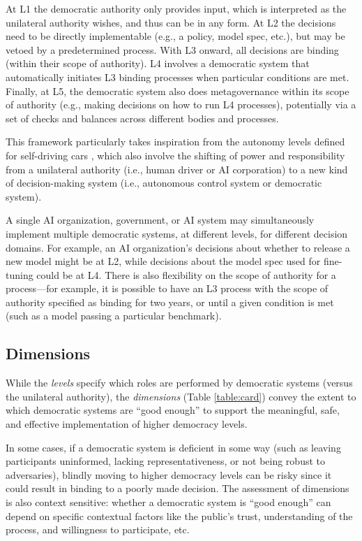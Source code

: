 \documentclass{article}
\begin{document}
    At L1 the democratic authority only provides input, which is interpreted as the unilateral authority wishes, and thus can be in any form. At L2 the decisions need to be directly implementable (e.g., a policy, model spec, etc.), but may be vetoed by a predetermined process. With L3 onward, all decisions are binding (within their scope of authority). L4 involves a democratic system that automatically initiates L3 binding processes when particular conditions are met. Finally, at L5, the democratic system also does metagovernance within its scope of authority (e.g., making decisions on how to run L4 processes), potentially via a set of checks and balances across different bodies and processes.

    This framework particularly takes inspiration from the autonomy levels defined for self-driving cars \cite{sae2021}, which also involve the shifting of power and responsibility from a unilateral authority (i.e., human driver or AI corporation) to a new kind of decision-making system (i.e., autonomous control system or democratic system). 
    
    A single AI organization, government, or AI system may simultaneously implement multiple democratic systems, at different levels, for different decision domains. For example, an AI organization's decisions about whether to release a new model might be at L2, while decisions about the model spec used for fine-tuning could be at L4. 
    There is also flexibility on the scope of authority for a process---for example, it is possible to have an L3 process with the scope of authority specified as binding for two years, or until a given condition is met (such as a model passing a particular benchmark). 


\subsection{Dimensions}
\label{sec:dimensions}

    While the \textit{levels} specify which roles are performed by democratic systems (versus the unilateral authority), the \textit{dimensions} (Table \ref{table:card}) convey the extent to which democratic systems are ``good enough'' to support the meaningful, safe, and effective implementation of higher democracy levels. 
   
    In some cases, if a democratic system is deficient in some way (such as leaving participants uninformed, lacking representativeness, or not being robust to adversaries), blindly moving to higher democracy levels can be risky since it could result in binding to a poorly made decision.
    The assessment of dimensions is also context sensitive: whether a democratic system is ``good enough'' can depend on specific contextual factors like the public's trust, understanding of the process, and willingness to participate, etc.
\end{document}

